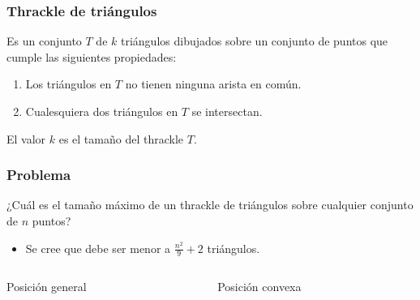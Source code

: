\documentclass{beamer}
\begin{document}
\begin{frame}
  \frametitle{Thrackle de triángulos}
  \begin{block}{}
    Es un conjunto $T$ de $k$ triángulos dibujados sobre un conjunto de
    puntos que cumple las siguientes propiedades:
    \begin{enumerate}
      \item Los triángulos en $T$ no tienen ninguna arista en común.
      \item Cualesquiera dos triángulos en $T$ se intersectan.
    \end{enumerate}
    El valor $k$ es el tamaño del thrackle $T$.
  \end{block}
  \begin{figure}[htb]
    \centering
    
  \end{figure}
\end{frame}

\begin{frame}
  \frametitle{Problema}
  \begin{block}{}
    ¿Cuál es el tamaño máximo de un thrackle de triángulos sobre
    cualquier conjunto de $n$ puntos?
    \begin{itemize}
      \item Se cree que debe ser menor a $\frac{n^2}{9}+2$ triángulos.
    \end{itemize}
  \end{block}
  \begin{columns}
    \begin{column}{0.5\textwidth}
      \begin{center}
        \begin{figure}[htb]
          \centering
          \def\svgwidth{4.5cm}
          
        \end{figure}
      Posición general
      \end{center}
    \end{column}
    \begin{column}{0.5\textwidth}
      \begin{center}
      \begin{figure}[htb]
        \centering
        \def\svgwidth{4.5cm}
        
      \end{figure}
      Posición convexa
      \end{center}
    \end{column}
  \end{columns}
\end{frame}
\end{document}
